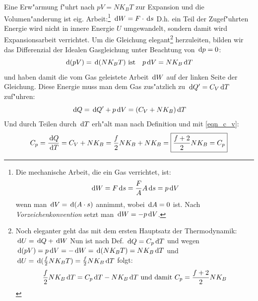 \begin{description}[\setlabelstyle{\bfseries\slshape}]
\item[Konstanter Druck] 
Eine Erw"armung f"uhrt nach $pV = NK_BT$ zur Expansion und die
Volumen"anderung ist eig. Arbeit:\footnote{Die mechanische Arbeit, die
ein Gas verrichtet, ist:\label{fn_herleitung_arbeit_gas}
$$
\, \mathrm{d} W = F \, \mathrm{d} s = \frac{F}{A} A \, \mathrm{d} s = p \, \mathrm{d} V
$$
wenn man $\, \mathrm{d} V = \, \mathrm{d} (A\cdot s)$ annimmt, wobei $\, \mathrm{d} A = 0$
ist. Nach \emph{Vorzeichenkonvention} setzt man $\, \mathrm{d} W = - p \, \mathrm{d} V$.} $\, \mathrm{d} W = F \cdot \, \mathrm{d} s$ D.h. ein
Teil der Zugef"uhrten Energie wird nicht in innere Energie $U$
umgewandelt, sondern damit wird Expansionsarbeit verrichtet.
Um die Gleichung elegant\footnote{Noch eleganter geht das mit dem
  ersten Hauptsatz der Thermodynamik: $\, \mathrm{d} U = \, \mathrm{d} Q + \, \mathrm{d} W$
  Nun ist nach Def. $\, \mathrm{d} Q = C_p \, \mathrm{d} T$ und wegen $\, \mathrm{d} (pV) =
  p \, \mathrm{d} V = -\, \mathrm{d} W = \, \mathrm{d}(NK_BT) = NK_B \, \mathrm{d} T$ und $\, \mathrm{d} U = \, \mathrm{d}
  (\frac{f}{2} NK_BT) = \frac{f}{2}NK_B \, \mathrm{d} T$ folgt:
$$
\frac{f}{2} NK_B \, \mathrm{d} T = C_p \, \mathrm{d} T - NK_B \, \mathrm{d} T \text{ und damit
} C_p = \frac{f+2}{2}NK_B
$$} herzuleiten, bilden wir das Differenzial der
Idealen Gasgleichung unter Beachtung von $\, \mathrm{d} p = 0$:
\begin{equation*}
   \, \mathrm{d}(pV) = \, \mathrm{d}(NK_BT) \text{ ist ~ } p \, \mathrm{d} V = NK_B \, \mathrm{d} T
\end{equation*}
und haben damit die vom Gas geleistete Arbeit $\, \mathrm{d} W$ auf der linken
Seite der Gleichung. Diese Energie muss man dem Gas zus"atzlich zu
$\, \mathrm{d} Q' = C_V \, \mathrm{d} T$ zuf"uhren:
\begin{equation*}
   \, \mathrm{d} Q = \, \mathrm{d} Q' + p\, \mathrm{d} V = (C_V + NK_B) \, \mathrm{d} T
\end{equation*}
Und durch Teilen durch $\, \mathrm{d} T$ erh"alt man nach Definition und mit
\eqref{eqn_c_v}:
\begin{equation}
   \label{eqn_differenz-c}
   C_p = \frac{\, \mathrm{d} Q}{\, \mathrm{d} T} = C_V + NK_B = \frac{f}{2} NK_B +
   NK_B = \boxed{\frac{f + 2}{2} NK_B = C_p}
\end{equation}
\end{description}


